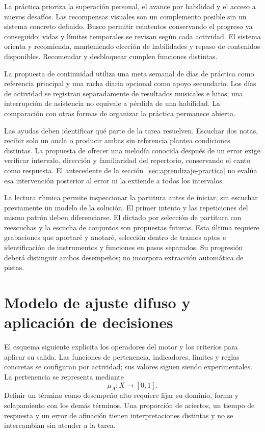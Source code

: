 La práctica prioriza la superación personal, el avance por habilidad y el acceso
a nuevos desafíos. Las recompensas visuales son un complemento posible sin un
sistema concreto definido. Busco permitir reintentos conservando el progreso
ya conseguido; vidas y límites temporales se revisan según cada actividad. El
sistema orienta y recomienda, manteniendo elección de habilidades y repaso de
contenidos disponibles. Recomendar y desbloquear cumplen funciones distintas.

La propuesta de continuidad utiliza una meta semanal de días de práctica como
referencia principal y una racha diaria opcional como apoyo secundario. Los días
de actividad se registran separadamente de resultados musicales e hitos; una
interrupción de asistencia no equivale a pérdida de una habilidad. La comparación
con otras formas de organizar la práctica permanece abierta.

Las ayudas deben identificar qué parte de la tarea resuelven. Escuchar dos notas,
recibir solo un ancla o producir ambas sin referencia plantea condiciones distintas.
La propuesta de ofrecer una melodía conocida después de un error exige verificar
intervalo, dirección y familiaridad del repertorio, conservando el canto como
respuesta. El antecedente de la sección~\ref{sec:aprendizaje-practica} no evalúa
esa intervención posterior al error ni la extiende a todos los intervalos.

La lectura rítmica permite inspeccionar la partitura antes de iniciar, sin escuchar
previamente un modelo de la solución. El primer intento y las repeticiones del mismo
patrón deben diferenciarse. El dictado por selección de partitura con reescuchas y
la escucha de conjuntos son propuestas futuras. Esta última requiere grabaciones
que aportaré y anotaré, selección dentro de tramos aptos e identificación
de instrumentos y funciones en pasos separados. Su progresión deberá distinguir
ambos desempeños; no incorpora extracción automática de pistas.

\section{Modelo de ajuste difuso y aplicación de decisiones}
\label{sec:diseno-dda}
El esquema siguiente explicita los operadores del motor y los criterios para
aplicar su salida. Las funciones de pertenencia, indicadores, límites y reglas
concretas se configuran por actividad; sus valores siguen siendo experimentales.
La pertenencia se representa mediante
\begin{equation}
  \mu_A\colon X\longrightarrow[0,1].
  \label{eq:pertenencia-difusa}
\end{equation}
Definir un término como desempeño alto requiere fijar su dominio, forma y
solapamiento con los demás términos. Una proporción de aciertos, un tiempo de
respuesta y un error de afinación tienen interpretaciones distintas y no se
intercambian sin atender a la tarea.

